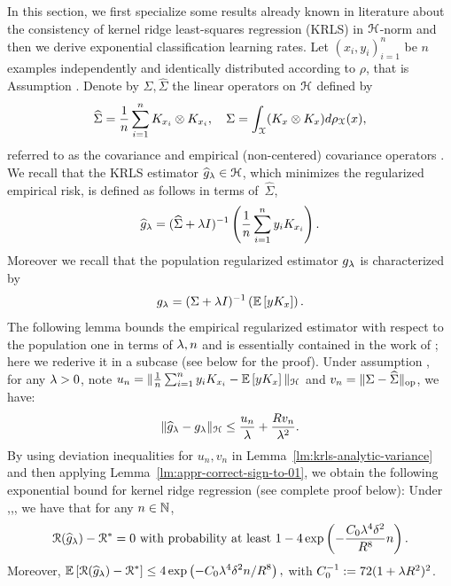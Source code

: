 In this section, we first specialize some results already known in literature about the consistency of kernel ridge least-squares regression (KRLS) in $\mathcal H$-norm \citep{caponnetto2007optimal} and then we derive exponential classification learning rates.
Let $(x_i,y_i)_{i=1}^n$ be $n$ examples independently and identically distributed according to $\rho$, that is Assumption . Denote by $\Sigma, \widehat{\Sigma}$ the linear operators on $\mathcal H$ defined by
$$ \widehat{\Sigma} = \frac{1}{n} \sum_{i=1}^n K_{x_i} \otimes K_{x_i}, \quad \Sigma = \int_{\mathcal X} (K_x \otimes K_x )d{\rho_{{\mathcal X}}}(x),$$
referred to as the covariance and empirical (non-centered) covariance operators \citep[see][and references therein]{fukumizu2004dimensionality}.
We recall that the KRLS estimator $\widehat{g}_\lambda \in \mathcal H$, which minimizes the regularized empirical risk, is defined as follows in terms of~$\widehat{\Sigma}$,
$$ \widehat{g}_\lambda = (\widehat\Sigma + \lambda I)^{-1} \left(\frac{1}{n} \sum_{i=1}^n y_i K_{x_i}\right).$$
Moreover we recall that the population regularized estimator $g_\lambda$ is characterized by \citep[see][]{caponnetto2007optimal}
$$ g_\lambda = (\Sigma + \lambda I)^{-1} \left(\mathbb{E}\left[{y K_x}\right]\right).$$
The following lemma bounds the empirical regularized estimator with respect to the population one in terms of $\lambda, n$ and is essentially contained in the work of \citet{caponnetto2007optimal}; here we rederive it in a subcase (see below for the proof).
\blm\label{lm:krls-analytic-variance}
Under assumption ,~ for any $\lambda > 0$, note $u_n = \|\frac{1}{n} \sum_{i=1}^n y_i K_{x_i} - \mathbb{E}\left[{y K_x}\right]\|_{\mathcal H}$ and $v_n = \|\Sigma - \widehat{\Sigma}\|_{\textrm {op}}$, we have:
$$\|\widehat{g}_\lambda - g_\lambda\|_{\mathcal H} \leq \frac{u_n}{\lambda} + \frac{R v_n}{\lambda^2}.$$
\elm
By using deviation inequalities for $u_n, v_n$ in Lemma~\ref{lm:krls-analytic-variance} and then applying Lemma~\ref{lm:appr-correct-sign-to-01}, we obtain the following exponential bound for kernel ridge regression (see complete proof below):
\bt\label{thm:exp-class-krls}
Under ,,, we have that for any $n \in \mathbb N$, 
$${\cal R}(\widehat{g}_\lambda) - {\cal R}^* = 0\mbox{ with probability at least }1-4 
\exp\left(-\frac{C_0 \lambda^4\delta^2}{R^8} n\right).$$
%
Moreover,
$ \displaystyle \mathbb{E}\left[{{\cal R}(\widehat{g}_\lambda) - {\cal R}^*}\right] \leq 4 
\exp\left(-C_0 \lambda^4\delta^2 n/ R^8\right), $
with $C_0^{-1} :=  72(1 + \lambda R^2)^2$.
\et  
